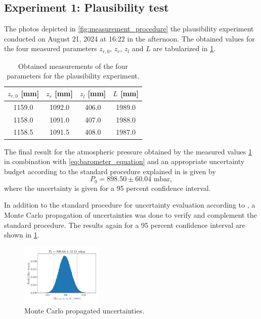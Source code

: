 \documentclass[a4paper,11pt, twocolumn]{article}
\begin{document}
\subsection{Experiment 1: Plausibility test}
The photos depicted in \cref{fig:measurement_procedure} the plausibility experiment conducted on August 21, 2024 at 16:22 in the afternoon. The obtained values for the four measured parameters $z_{r,0}$, $z_r$, $z_l$ and $L$ are tabularized in \cref{tab:meas_values}.
\begin{table}[h]
	\small
	\centering
	\begin{tabular}{|c|c|c|c|}
		\hline
		\textbf{$z_{r,0}$ [mm]} & \textbf{$z_r$ [mm]} & \textbf{$z_l$ [mm]} & \textbf{$L$ [mm]} \\
	\hline\hline
	1159.0 & 1092.0 & 406.0	& 1989.0 \\
	\hline
	1158.0 & 1091.0 & 407.0	& 1988.0 \\
	\hline
	1158.5 & 1091.5 & 408.0 & 1987.0 \\
	\hline
	\end{tabular}
	\label{tab:meas_values}
	\caption{Obtained measurements of the four parameters for the plausibility experiment.}
\end{table}

The final result for the atmospheric pressure obtained by the measured values \cref{tab:meas_values} in combination with \cref{eq:barometer_equation} and an appropriate uncertainty budget according to the standard procedure explained in \cite{GUM2023} is given by \begin{equation}
	P_0 = 898.50 \pm 60.04 \text{ mbar},
\end{equation} where the uncertainty is given for a 95 percent confidence interval. 

In addition to the standard procedure for uncertainty evaluation according to \cite{GUM2023}, a Monte Carlo propagation of uncertainties was done to verify and complement the standard procedure. The results again for a 95 percent confidence interval are shown in \cref{fig:result_mc}.
\begin{figure}[h]
	\centering
	\includegraphics[width=0.35\textwidth]{figures/result_mc.pdf}
	\caption{Monte Carlo propagated uncertainties.}
	\label{fig:result_mc}
\end{figure}
\end{document}
